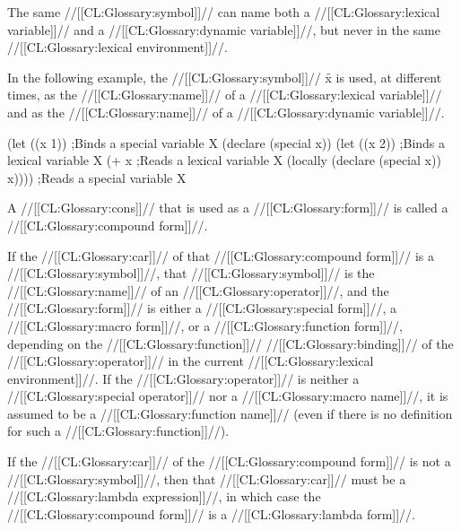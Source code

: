 





The same //[[CL:Glossary:symbol]]// can name both 
    a //[[CL:Glossary:lexical variable]]// 
and a //[[CL:Glossary:dynamic variable]]//,
but never in the same //[[CL:Glossary:lexical environment]]//.

In the following example, the //[[CL:Glossary:symbol]]// \f{x} is used,
at different times, 
    as the //[[CL:Glossary:name]]// of a //[[CL:Glossary:lexical variable]]//
and as the //[[CL:Glossary:name]]// of a //[[CL:Glossary:dynamic variable]]//.
 
\code
 (let ((x 1))            ;Binds a special variable X
   (declare (special x))
   (let ((x 2))          ;Binds a lexical variable X
     (+ x                ;Reads a lexical variable X
        (locally (declare (special x))
                 x))))   ;Reads a special variable X
\endcode

\endsubsubsubsubsection%

\endsubsubsubsection%


A //[[CL:Glossary:cons]]// that is used as a //[[CL:Glossary:form]]// is called a //[[CL:Glossary:compound form]]//.

If the //[[CL:Glossary:car]]// of that //[[CL:Glossary:compound form]]// is a //[[CL:Glossary:symbol]]//, 
that //[[CL:Glossary:symbol]]// is the //[[CL:Glossary:name]]// of an //[[CL:Glossary:operator]]//,
and the //[[CL:Glossary:form]]// is either a //[[CL:Glossary:special form]]//, a //[[CL:Glossary:macro form]]//,
or a //[[CL:Glossary:function form]]//, depending on the //[[CL:Glossary:function]]// //[[CL:Glossary:binding]]// 
of the //[[CL:Glossary:operator]]// in the current //[[CL:Glossary:lexical environment]]//.
If the //[[CL:Glossary:operator]]// is neither a //[[CL:Glossary:special operator]]//
nor a //[[CL:Glossary:macro name]]//, it is assumed to be a //[[CL:Glossary:function name]]//
(even if there is no definition for such a //[[CL:Glossary:function]]//).

If the //[[CL:Glossary:car]]// of the //[[CL:Glossary:compound form]]// is not a //[[CL:Glossary:symbol]]//,
then that //[[CL:Glossary:car]]// must be a //[[CL:Glossary:lambda expression]]//,
in which case the //[[CL:Glossary:compound form]]// is a //[[CL:Glossary:lambda form]]//.

